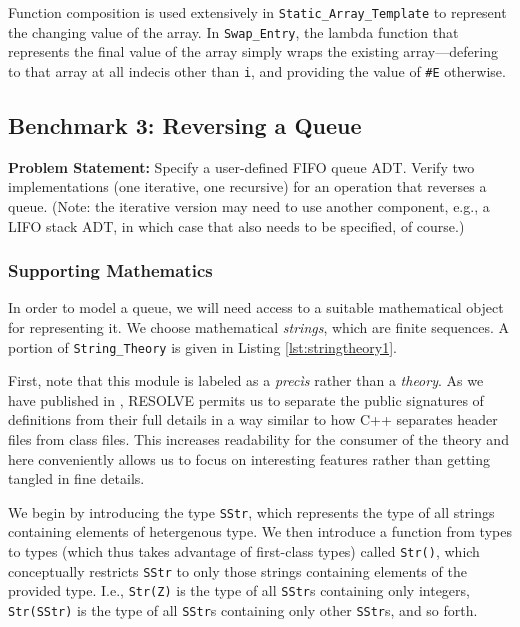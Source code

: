 Function composition is used extensively in \texttt{Static\_Array\_Template} to represent the changing value of the array.  In \texttt{Swap\_Entry}, the lambda function that represents the final value of the array simply wraps the existing array---defering to that array at all indecis other than \texttt{i}, and providing the value of \texttt{\#E} otherwise.

	\subsection{Benchmark 3: Reversing a Queue}	%

\textbf{Problem Statement:} Specify a user-defined FIFO queue ADT. Verify two implementations (one iterative, one recursive) for an operation that reverses a queue. (Note: the iterative version may need to use another component, e.g., a LIFO stack ADT, in which case that also needs to be specified, of course.)

		\subsubsection{Supporting Mathematics}	%

In order to model a queue, we will need access to a suitable mathematical object for representing it.  We choose mathematical \emph{strings}, which are finite sequences.  A portion of \texttt{String\_Theory} is given in Listing \ref{lst:stringtheory1}.



First, note that this module is labeled as a \emph{prec\`{i}s} rather than a \emph{theory}.  As we have published in \cite{smith08}, RESOLVE permits us to separate the public signatures of definitions from their full details in a way similar to how C++ separates header files from class files.  This increases readability for the consumer of the theory and here conveniently allows us to focus on interesting features rather than getting tangled in fine details.

We begin by introducing the type \texttt{SStr}, which represents the type of all strings containing elements of hetergenous type.  We then introduce a function from types to types (which thus takes advantage of first-class types) called \texttt{Str()}, which conceptually restricts \texttt{SStr} to only those strings containing elements of the provided type.  I.e., \texttt{Str(Z)} is the type of all \texttt{SStr}s containing only integers, \texttt{Str(SStr)} is the type of all \texttt{SStr}s containing only other \texttt{SStr}s, and so forth.

